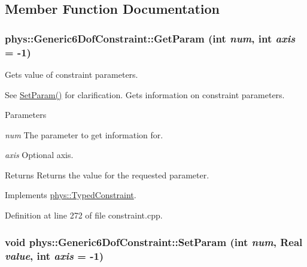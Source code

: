 \subsection{Member Function Documentation}
\hypertarget{classphys_1_1Generic6DofConstraint_a822152201f9bd6d0a3e1512fa25b3f49}{
\subsubsection[{GetParam}]{ phys::Generic6DofConstraint::GetParam (int {\em num}, \/  int {\em axis} = {\ttfamily -\/1})}}
\label{de/d2a/classphys_1_1Generic6DofConstraint_a822152201f9bd6d0a3e1512fa25b3f49}


Gets value of constraint parameters. 

See \hyperlink{classphys_1_1Generic6DofConstraint_a644245f0533a2fe1586609fcf1f48171}{SetParam()} for clarification. Gets information on constraint parameters. 
\begin{DoxyParams}{Parameters}
\item[{\em num}]The parameter to get information for. \item[{\em axis}]Optional axis. \end{DoxyParams}
\begin{DoxyReturn}{Returns}
Returns the value for the requested parameter. 
\end{DoxyReturn}


Implements \hyperlink{classphys_1_1TypedConstraint_ab6140d40e9476c3dc46e2802e8097421}{phys::TypedConstraint}.



Definition at line 272 of file constraint.cpp.

\hypertarget{classphys_1_1Generic6DofConstraint_a644245f0533a2fe1586609fcf1f48171}{
\subsubsection[{SetParam}]{\setlength{\rightskip}{0pt plus 5cm}void phys::Generic6DofConstraint::SetParam (int {\em num}, \/  {\bf Real} {\em value}, \/  int {\em axis} = {\ttfamily -\/1})}}
\label{de/d2a/classphys_1_1Generic6DofConstraint_a644245f0533a2fe1586609fcf1f48171}


